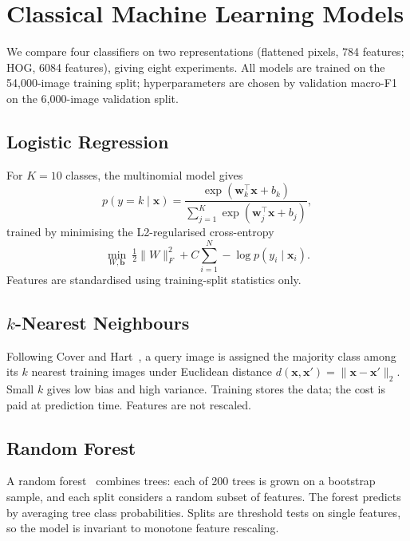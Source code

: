 \section{Classical Machine Learning Models}
\label{sec:classical}
We compare four classifiers on two representations (flattened pixels, 784 features; HOG, 6084 features),
giving eight experiments. All models are trained on the 54{,}000-image training split; hyperparameters
are chosen by validation macro-F1 on the 6{,}000-image validation split.

\subsection{Logistic Regression}
For $K=10$ classes, the multinomial model gives
\begin{equation}
p(y=k\mid \mathbf{x}) = \frac{\exp(\mathbf{w}_k^{\top}\mathbf{x}+b_k)}{\sum_{j=1}^{K}\exp(\mathbf{w}_j^{\top}\mathbf{x}+b_j)},
\end{equation}
trained by minimising the L2-regularised cross-entropy
\begin{equation}
\min_{W,\mathbf{b}}\ \tfrac12\lVert W\rVert_F^2 + C\sum_{i=1}^{N}-\log p(y_i\mid \mathbf{x}_i).
\end{equation}
Features are standardised using training-split statistics only.

\subsection{$k$-Nearest Neighbours}
Following Cover and Hart~\cite{cover1967nearest}, a query image is assigned the majority class among its $k$ nearest training images under Euclidean distance
$d(\mathbf{x},\mathbf{x}')=\lVert \mathbf{x}-\mathbf{x}'\rVert_2$. Small $k$ gives low bias and high variance.
Training stores the data; the cost is paid at prediction time. Features are not rescaled.

\subsection{Random Forest}
A random forest~\cite{breiman2001random} combines trees: each of 200 trees is grown on a bootstrap sample, and each split considers a random subset of features.
The forest predicts by averaging tree class probabilities. Splits are threshold tests on single features,
so the model is invariant to monotone feature rescaling.

